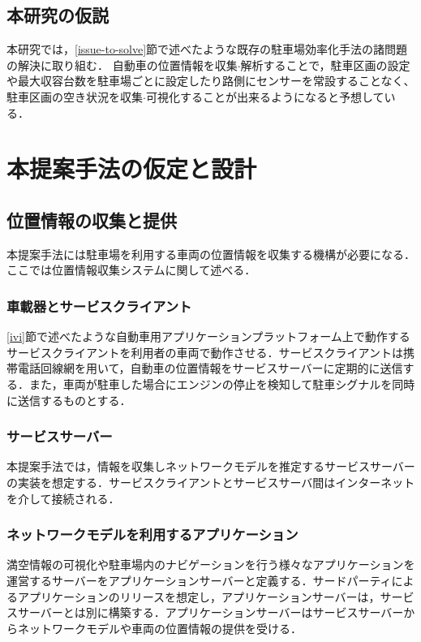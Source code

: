 \subsection{本研究の仮説}
本研究では，\ref{issue-to-solve}節で述べたような既存の駐車場効率化手法の諸問題の解決に取り組む．
自動車の位置情報を収集$\cdot$解析することで，駐車区画の設定や最大収容台数を駐車場ごとに設定したり路側にセンサーを常設することなく、駐車区画の空き状況を収集$\cdot$可視化することが出来るようになると予想している．

\section{本提案手法の仮定と設計}
\subsection{位置情報の収集と提供}
本提案手法には駐車場を利用する車両の位置情報を収集する機構が必要になる．ここでは位置情報収集システムに関して述べる．

\subsubsection{車載器とサービスクライアント}
\ref{ivi}節で述べたような自動車用アプリケーションプラットフォーム上で動作するサービスクライアントを利用者の車両で動作させる．サービスクライアントは携帯電話回線網を用いて，自動車の位置情報をサービスサーバーに定期的に送信する．また，車両が駐車した場合にエンジンの停止を検知して駐車シグナルを同時に送信するものとする．

\subsubsection{サービスサーバー}
本提案手法では，情報を収集しネットワークモデルを推定するサービスサーバーの実装を想定する．サービスクライアントとサービスサーバ間はインターネットを介して接続される．

\subsubsection{ネットワークモデルを利用するアプリケーション}
満空情報の可視化や駐車場内のナビゲーションを行う様々なアプリケーションを運営するサーバーをアプリケーションサーバーと定義する．サードパーティによるアプリケーションのリリースを想定し，アプリケーションサーバーは，サービスサーバーとは別に構築する．アプリケーションサーバーはサービスサーバーからネットワークモデルや車両の位置情報の提供を受ける．


